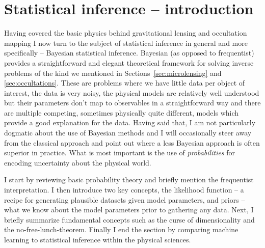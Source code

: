 \documentclass[12pt,dvipsnames]{report}
\begin{document}
\section{Statistical inference -- introduction}
\label{sec:inference_intro}
Having covered the basic physics behind gravitational lensing and occultation mapping I
now turn to the subject of statistical inference in general and more specifically --
Bayesian statistical inference. Bayesian (as opposed to frequentist)
provides a straightforward and elegant theoretical framework for solving inverse
problems of the kind we mentioned
in Sections~\ref{sec:microlensing}  and \ref{sec:occultations}. These are problems
where we have little data per object of interest, the data is very noisy,
the physical models are relatively well understood but their parameters don't map
to observables in a straightforward way and there are multiple competing, sometimes
physically  quite different, models which provide a good explanation for the data.
Having said that, I am not particularly dogmatic about the use of Bayesian methods
and I will occasionally steer away from the classical approach and point out where
a less Bayesian approach is often superior in practice.  What is most important is the
use of \emph{probabilities} for encoding uncertainty about the physical world.

I start by reviewing basic probability theory and briefly mention the
frequentist interpretation. I then introduce two key concepts, the likelihood
function -- a recipe for generating plausible datasets given model parameters,
and priors -- what we know about the model parameters prior to gathering any
data. Next, I briefly summarize fundamental concepts such as the curse of
dimensionality and the no-free-lunch-theorem. Finally I end the section by
comparing machine learning to statistical inference within the physical
sciences.
\end{document}

